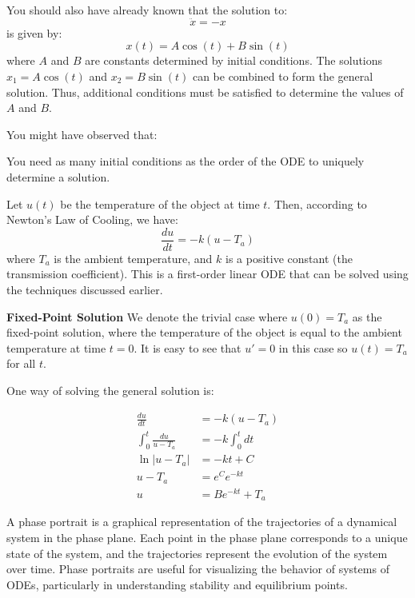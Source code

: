 \documentclass[11pt]{article}
\begin{document}
\begin{example}[Superposition]
    You should also have already known that the solution to:
    $$ \ddot{x} = -x $$
    is given by:
    $$ x(t) = A \cos(t) + B \sin(t) $$
    where \( A \) and \( B \) are constants determined by initial conditions. The solutions $x_1 = A \cos(t)$ and $x_2 = B \sin(t)$ can be combined to form the general solution. Thus, additional conditions must be satisfied to determine the values of \( A \) and \( B \).
\end{example}
You might have observed that:
\begin{theorem}
    You need as many initial conditions as the order of the ODE to uniquely determine a solution.
\end{theorem}

\begin{example}
    Let $u(t)$ be the temperature of the object at time $t$. Then, according to Newton's Law of Cooling, we have:
    $$
    \frac{du}{dt} = -k(u - T_a)
    $$
    where \( T_a \) is the ambient temperature, and \( k \) is a positive constant (the transmission coefficient). This is a first-order linear ODE that can be solved using the techniques discussed earlier.

    \textbf{Fixed-Point Solution} We denote the trivial case where \( u(0) = T_a \) as the fixed-point solution, where the temperature of the object is equal to the ambient temperature at time \( t = 0 \). It is easy to see that \( u' = 0 \) in this case so \( u(t) = T_a \) for all \( t \).

    One way of solving the general solution is:

    \begin{align*}
        \frac{du}{dt} &= -k(u - T_a) \\
        \int_0^t \frac{du}{u - T_a} &= -k \int_0^t dt \\
        \ln|u - T_a| &= -kt + C \\
        u - T_a &= e^C e^{-kt} \\
        u &= Be^{-kt} + T_a
    \end{align*}

\end{example}

\begin{definition}
    A phase portrait is a graphical representation of the trajectories of a dynamical system in the phase plane. Each point in the phase plane corresponds to a unique state of the system, and the trajectories represent the evolution of the system over time. Phase portraits are useful for visualizing the behavior of systems of ODEs, particularly in understanding stability and equilibrium points.
\end{definition}
\end{document}
